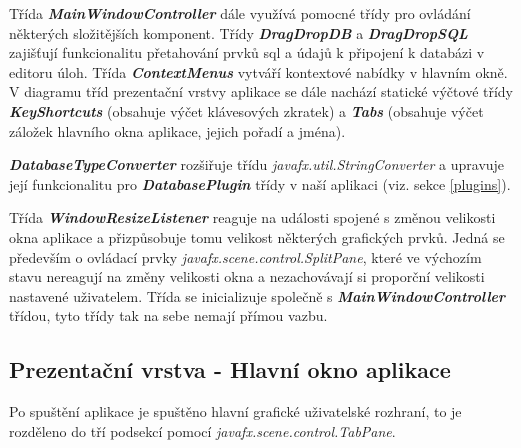 \documentclass[czech,bachelor,public,dept460,male,cpdeclaration,twoside]{diploma}
\begin{document}
Třída \textbf{\emph{MainWindowController}} dále využívá pomocné třídy pro ovládání některých složitějších komponent. Třídy \textbf{\emph{DragDropDB}} a \textbf{\emph{DragDropSQL}} zajišťují funkcionalitu přetahování prvků sql a údajů k připojení k databázi v editoru úloh. Třída \textbf{\emph{ContextMenus}} vytváří kontextové nabídky v hlavním okně. V diagramu tříd prezentační vrstvy aplikace se dále nachází statické výčtové třídy \textbf{\emph{KeyShortcuts}} (obsahuje výčet klávesových zkratek) a \textbf{\emph{Tabs}} (obsahuje výčet záložek hlavního okna aplikace, jejich pořadí a jména).

\textbf{\emph{DatabaseTypeConverter}} rozšiřuje třídu \textit{javafx.util.StringConverter} a upravuje její funkcionalitu pro \textbf{\emph{DatabasePlugin}} třídy v naší aplikaci (viz. sekce \ref{plugins}).

Třída \textbf{\emph{WindowResizeListener}} reaguje na události spojené s změnou velikosti okna aplikace a přizpůsobuje tomu velikost některých grafických prvků. Jedná se především o ovládací prvky \textit{javafx.scene.control.SplitPane}, které ve výchozím stavu nereagují na změny velikosti okna a nezachovávají si proporční velikosti nastavené uživatelem. Třída se inicializuje společně s \textbf{\emph{MainWindowController}} třídou, tyto třídy tak na sebe nemají přímou vazbu.


\subsection{Prezentační vrstva - Hlavní okno aplikace}
Po spuštění aplikace je spuštěno hlavní grafické uživatelské rozhraní, to je rozděleno do tří podsekcí pomocí \textit{javafx.scene.control.TabPane}.
\end{document}
